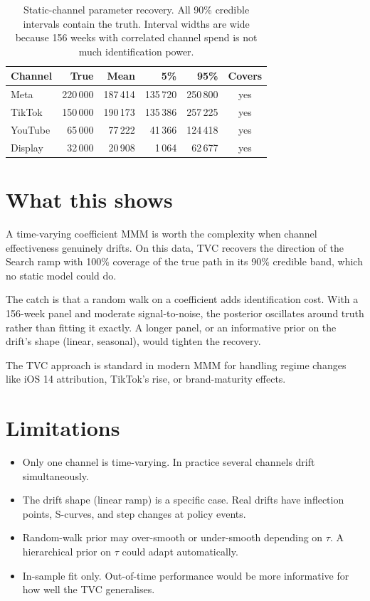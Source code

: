 \documentclass[a4paper,11pt]{article}
\begin{document}
\begin{table}[H]
\centering
\begin{tabular}{l r r r r c}
\toprule
\textbf{Channel} & \textbf{True} & \textbf{Mean} & \textbf{5\%} & \textbf{95\%} & \textbf{Covers} \\
\midrule
Meta    & 220\,000 & 187\,414 & 135\,720 & 250\,800 & yes \\
TikTok  & 150\,000 & 190\,173 & 135\,386 & 257\,225 & yes \\
YouTube & 65\,000  & 77\,222  & 41\,366  & 124\,418 & yes \\
Display & 32\,000  & 20\,908  & 1\,064   & 62\,677  & yes \\
\bottomrule
\end{tabular}
\caption{Static-channel parameter recovery. All 90\% credible intervals contain the truth. Interval widths are wide because 156 weeks with correlated channel spend is not much identification power.}
\end{table}

\section{What this shows}

A time-varying coefficient MMM is worth the complexity when channel
effectiveness genuinely drifts. On this data, TVC recovers the
direction of the Search ramp with 100\% coverage of the true path in
its 90\% credible band, which no static model could do.

The catch is that a random walk on a coefficient adds identification
cost. With a 156-week panel and moderate signal-to-noise, the posterior
oscillates around truth rather than fitting it exactly. A longer panel,
or an informative prior on the drift's shape (linear, seasonal), would
tighten the recovery.

The TVC approach is standard in modern MMM for handling regime changes
like iOS 14 attribution, TikTok's rise, or brand-maturity effects.

\section{Limitations}

\begin{itemize}
\item Only one channel is time-varying. In practice several channels
drift simultaneously.
\item The drift shape (linear ramp) is a specific case. Real drifts
have inflection points, S-curves, and step changes at policy events.
\item Random-walk prior may over-smooth or under-smooth depending on
$\tau$. A hierarchical prior on $\tau$ could adapt automatically.
\item In-sample fit only. Out-of-time performance would be more
informative for how well the TVC generalises.
\end{itemize}
\end{document}
